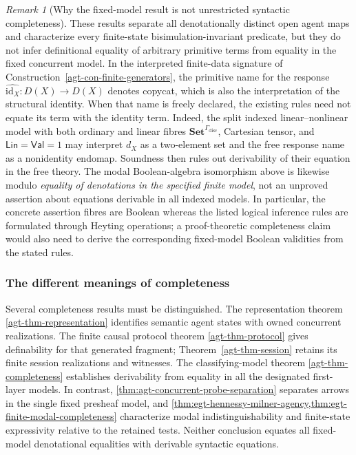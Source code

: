 \documentclass[11pt,a4paper]{article}
\numberwithin{equation}{section}
\theoremstyle{definition}
\theoremstyle{remark}
\newtheorem{remark}[theorem]{Remark}
\theoremstyle{plain}
\providecommand{\Lin}{\mathsf{Lin}}
\providecommand{\Val}{\mathsf{Val}}
\providecommand{\Set}{\mathbf{Set}}
\begin{document}
\begin{remark}[Why the fixed-model result is not unrestricted syntactic
completeness]
\label{rem:agt-fixed-completeness-scope}
These results separate all denotationally distinct open agent maps and
characterize every finite-state bisimulation-invariant predicate, but
they do not infer definitional equality of arbitrary primitive terms
from equality in the fixed concurrent model. In the interpreted
finite-data signature of
Construction~\ref{agt-con-finite-generators}, the primitive name for
the response $\widehat{\mathrm{id}_X}:D(X)\to D(X)$ denotes copycat,
which is also the interpretation of the structural identity. When that
name is freely declared, the existing rules need not equate its term
with the identity term. Indeed, the split indexed linear--nonlinear
model with both ordinary and linear fibres $\Set^{\Gamma_{\mathrm{disc}}}$,
Cartesian tensor, and $\Lin=\Val=1$ may interpret $d_X$ as a two-element
set and the free response name as a nonidentity endomap. Soundness
then rules out derivability of their equation in the free theory.
The modal Boolean-algebra isomorphism above is likewise modulo
\emph{equality of denotations in the specified finite model}, not an
unproved assertion about equations derivable in all indexed models.
In particular, the concrete assertion fibres are Boolean whereas the
listed logical inference rules are formulated through Heyting operations;
a proof-theoretic completeness claim would also need to derive the
corresponding fixed-model Boolean validities from the stated rules.
\end{remark}

\subsubsection{The different meanings of completeness}

Several completeness results must be distinguished. The representation
theorem \ref{agt-thm-representation} identifies semantic agent states
with owned concurrent realizations. The finite causal protocol theorem
\ref{agt-thm-protocol} gives definability for that generated fragment;
Theorem~\ref{agt-thm-session} retains its finite session realizations
and witnesses. The classifying-model theorem
\ref{agt-thm-completeness} establishes derivability from equality in
all the designated first-layer models. In contrast,
\cref{thm:agt-concurrent-probe-separation} separates arrows in the
single fixed presheaf model, and
\cref{thm:egt-hennessy-milner-agency,thm:egt-finite-modal-completeness}
characterize modal indistinguishability and finite-state expressivity
relative to the retained tests. Neither conclusion equates all
fixed-model denotational equalities with derivable syntactic equations.
\end{document}
